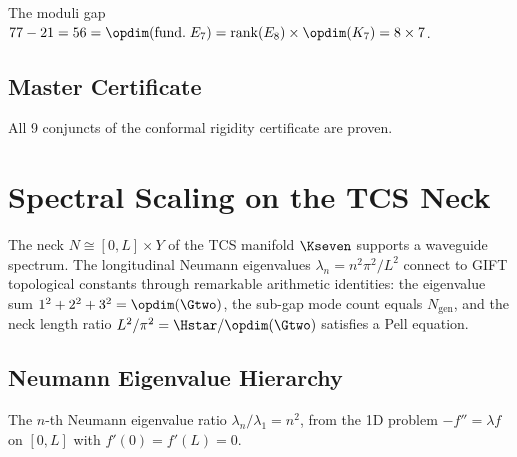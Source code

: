 \begin{theorem}[$\bthree - \btwo = \opdim(\mathrm{fund.}\; E_7)$]\label{thm:moduli_gap}
    \leanok
    The moduli gap $77 - 21 = 56 = \opdim(\mathrm{fund.}\; E_7)
    = \mathrm{rank}(E_8) \times \opdim(K_7) = 8 \times 7$.
\end{theorem}

\section{Master Certificate}

\begin{theorem}\label{thm:conformal_rigidity_cert}
    \leanok
    All 9 conjuncts of the conformal rigidity certificate are proven.
\end{theorem}


\chapter{Spectral Scaling on the TCS Neck}\label{chap:spectral_scaling}

The neck $N \cong [0,L] \times Y$ of the TCS manifold $\Kseven$ supports a
waveguide spectrum. The longitudinal Neumann eigenvalues
$\lambda_n = n^2 \pi^2/L^2$ connect to GIFT topological constants through
remarkable arithmetic identities: the eigenvalue sum $1^2+2^2+3^2 = \opdim(\Gtwo)$,
the sub-gap mode count equals $N_{\mathrm{gen}}$, and the neck length ratio
$L^2/\pi^2 = \Hstar/\opdim(\Gtwo)$ satisfies a Pell equation.

\section{Neumann Eigenvalue Hierarchy}

\begin{definition}\label{def:neumann_ratio}
    \leanok
    The $n$-th Neumann eigenvalue ratio $\lambda_n/\lambda_1 = n^2$,
    from the 1D problem $-f'' = \lambda f$ on $[0,L]$ with $f'(0) = f'(L) = 0$.
\end{definition}

